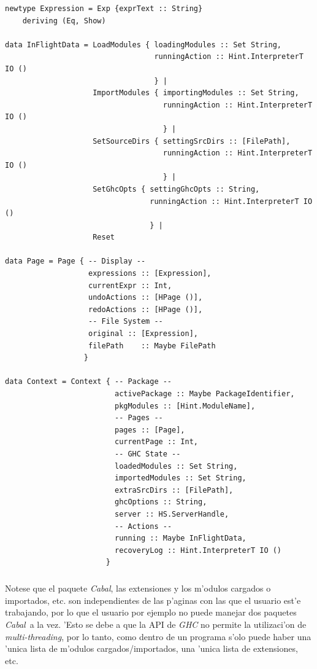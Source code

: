 \documentclass[a4paper]{article}
\newcommand{\cabal}{\textsl{Cabal}}
\begin{document}
\begin{center}\begin{lstlisting}
newtype Expression = Exp {exprText :: String}       
    deriving (Eq, Show)

data InFlightData = LoadModules { loadingModules :: Set String,
                                  runningAction :: Hint.InterpreterT IO ()
                                  } |
                    ImportModules { importingModules :: Set String,
                                    runningAction :: Hint.InterpreterT IO ()
                                    } | 
                    SetSourceDirs { settingSrcDirs :: [FilePath],
                                    runningAction :: Hint.InterpreterT IO ()
                                    } |
                    SetGhcOpts { settingGhcOpts :: String,
                                 runningAction :: Hint.InterpreterT IO ()
                                 } |
                    Reset

data Page = Page { -- Display --
                   expressions :: [Expression],
                   currentExpr :: Int,
                   undoActions :: [HPage ()],
                   redoActions :: [HPage ()],
                   -- File System --
                   original :: [Expression],
                   filePath    :: Maybe FilePath
                  }
                  
data Context = Context { -- Package --
                         activePackage :: Maybe PackageIdentifier,
                         pkgModules :: [Hint.ModuleName],
                         -- Pages --
                         pages :: [Page],
                         currentPage :: Int,
                         -- GHC State --
                         loadedModules :: Set String,
                         importedModules :: Set String,
                         extraSrcDirs :: [FilePath],
                         ghcOptions :: String,
                         server :: HS.ServerHandle,
                         -- Actions --
                         running :: Maybe InFlightData,
                         recoveryLog :: Hint.InterpreterT IO ()
                       }
\end{lstlisting}\end{center}
\subparagraph{}Notese que el paquete \cabal, las extensiones y los m'odulos cargados o importados, etc. son independientes de las p'aginas con las que el usuario est'e trabajando, por lo que el usuario por ejemplo no puede manejar dos paquetes \cabal\ a la vez.  'Esto se debe a que la API de \textsl{GHC} no permite la utilizaci'on de \textsl{multi-threading}, por lo tanto, como dentro de un programa s'olo puede haber una 'unica lista de m'odulos cargados/importados, una 'unica lista de extensiones, etc.
\end{document}
